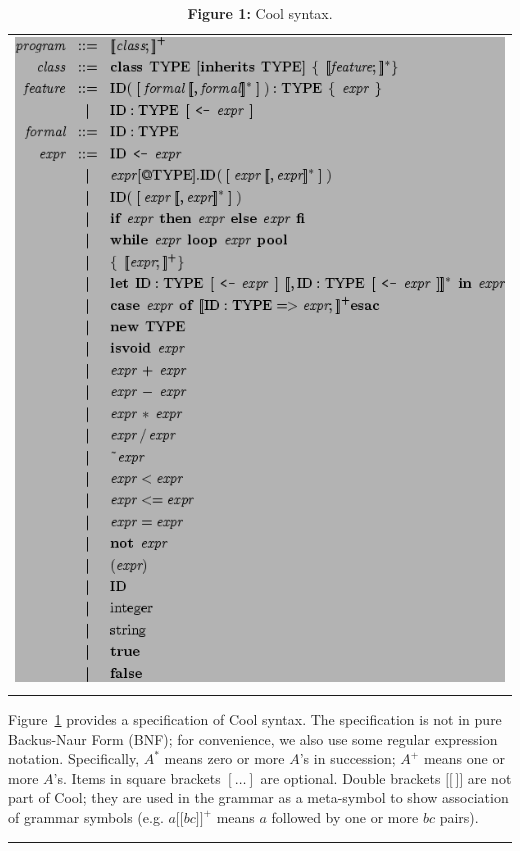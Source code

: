 \documentclass[]{article}
\begin{document}
\begin{longtable}[c]{@{}l@{}}
\hline\noalign{\medskip}
\includegraphics{img43.png}
\\\noalign{\medskip}
\hline
\noalign{\medskip}
\caption{\textbf{Figure 1:} Cool syntax.}
\end{longtable}

Figure~\hyperref[fig1]{1} provides a specification of Cool syntax. The
specification is not in pure Backus-Naur Form (BNF); for convenience, we
also use some regular expression notation. Specifically, $A^{\ast}$
means zero or more $A$'s in succession; $A^+$ means one or more $A$'s.
Items in square brackets $[\ldots]$ are optional. Double brackets
$\lbrack\!\lbrack \, \rbrack\!\rbrack $ are not part of Cool; they are
used in the grammar as a meta-symbol to show association of grammar
symbols (e.g. $a \lbrack\!\lbrack b c \rbrack\!\rbrack ^ {+}$ means $a$
followed by one or more $bc$ pairs).

\begin{center}\rule{3in}{0.4pt}\end{center}
\end{document}
